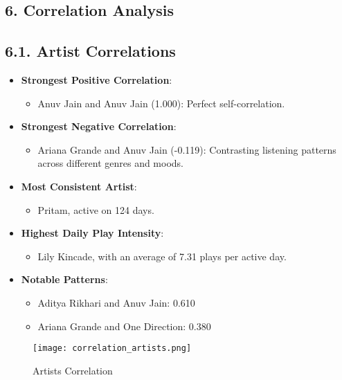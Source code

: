 \documentclass[12pt]{article}
\begin{document}
\begin{itemize}
\section*{6. Correlation Analysis}

\subsection*{6.1. Artist Correlations}
\begin{itemize}
    \item \textbf{Strongest Positive Correlation}:
    \begin{itemize}
        \item Anuv Jain and Anuv Jain (1.000): Perfect self-correlation.
    \end{itemize}
    \item \textbf{Strongest Negative Correlation}:
    \begin{itemize}
        \item Ariana Grande and Anuv Jain (-0.119): Contrasting listening patterns across different genres and moods.
    \end{itemize}
    \item \textbf{Most Consistent Artist}:
    \begin{itemize}
        \item Pritam, active on 124 days.
    \end{itemize}
    \item \textbf{Highest Daily Play Intensity}:
    \begin{itemize}
        \item Lily Kincade, with an average of 7.31 plays per active day.
    \end{itemize}
    \item \textbf{Notable Patterns}:
    \begin{itemize}
        \item Aditya Rikhari and Anuv Jain: 0.610
        \item Ariana Grande and One Direction: 0.380
    \end{itemize}
\end{itemize}
\begin{figure}[H]
    \centering
    \texttt{[image: correlation\_artists.png]}
    \caption{Artists Correlation}
    \label{fig:enter-label}
\end{figure}


\end{itemize}
\end{document}
